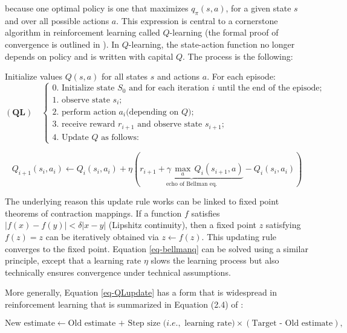 because one optimal policy is one that maximizes $q_\pi(s,a)$, for a given state $s$ and over all possible actions $a$. This expression is central to a cornerstone algorithm in reinforcement learning called $Q$-learning (the formal proof of convergence is outlined in \cite{watkins1992q}). In $Q$-learning, the state-action function no longer depends on policy and is written with capital $Q$. The process is the following:

Initialize values $Q(s,a)$ for all states $s$ and actions $a$. For each episode:\newline
\begin{equation}
(\textbf{QL}) \quad \left\{
\begin{array}{l}
\text{0. Initialize state } S_0 \text{ and for each iteration } i \text{ until the end of the episode;}   \\
\text{1. observe state } s_i;    \\
\text{2. perform action } a_i \text{(depending on } Q);   \\
\text{3. receive reward }r_{i+1} \text{ and observe state } s_{i+1};  \\
\text{4. Update } Q \text{ as follows: }
\end{array} \right.
\end{equation}

\begin{equation}
\label{eq-QLupdate}
Q_{i+1}(s_i,a_i) \longleftarrow Q_i(s_i,a_i) + \eta  \left(\underbrace{r_{i+1}+\gamma \, \underset{a}{\max} \, Q_i(s_{i+1},a)}_{\text{echo of Bellman eq.}}-Q_i(s_i,a_i) \right)
\end{equation}

The underlying reason this update rule works can be linked to fixed point theorems of contraction mappings. If a function $f$ satisfies $|f(x) -f(y)|< \delta |x -y|$ (Lipshitz continuity), then a fixed point $z$ satisfying $f(z)=z$ can be iteratively obtained via $z \leftarrow f(z)$. This updating rule converges to the fixed point. Equation \ref{eq-bellmanq} can be solved using a similar principle, except that a learning rate $\eta$ slows the learning process but also technically ensures convergence under technical assumptions.

More generally, Equation \ref{eq-QLupdate} has a form that is widespread in reinforcement learning that is summarized in Equation (2.4) of \cite{sutton2018reinforcement}:

\begin{equation}
\label{eq-RLeq}
\text{New estimate} \leftarrow \text{Old estimate + Step size (}i.e., \text{ learning rate)} \times (\text{Target - Old estimate}),
\end{equation}

